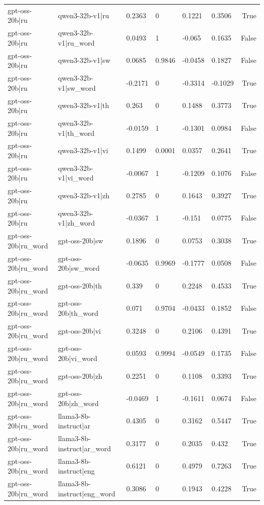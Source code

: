 \begin{table}
\begin{tabular}{llllllr}
gpt-oss-20b|ru & qwen3-32b-v1|ru & 0.2363 & 0 & 0.1221 & 0.3506 & True \\
gpt-oss-20b|ru & qwen3-32b-v1|ru_word & 0.0493 & 1 & -0.065 & 0.1635 & False \\
gpt-oss-20b|ru & qwen3-32b-v1|sw & 0.0685 & 0.9846 & -0.0458 & 0.1827 & False \\
gpt-oss-20b|ru & qwen3-32b-v1|sw_word & -0.2171 & 0 & -0.3314 & -0.1029 & True \\
gpt-oss-20b|ru & qwen3-32b-v1|th & 0.263 & 0 & 0.1488 & 0.3773 & True \\
gpt-oss-20b|ru & qwen3-32b-v1|th_word & -0.0159 & 1 & -0.1301 & 0.0984 & False \\
gpt-oss-20b|ru & qwen3-32b-v1|vi & 0.1499 & 0.0001 & 0.0357 & 0.2641 & True \\
gpt-oss-20b|ru & qwen3-32b-v1|vi_word & -0.0067 & 1 & -0.1209 & 0.1076 & False \\
gpt-oss-20b|ru & qwen3-32b-v1|zh & 0.2785 & 0 & 0.1643 & 0.3927 & True \\
gpt-oss-20b|ru & qwen3-32b-v1|zh_word & -0.0367 & 1 & -0.151 & 0.0775 & False \\
gpt-oss-20b|ru_word & gpt-oss-20b|sw & 0.1896 & 0 & 0.0753 & 0.3038 & True \\
gpt-oss-20b|ru_word & gpt-oss-20b|sw_word & -0.0635 & 0.9969 & -0.1777 & 0.0508 & False \\
gpt-oss-20b|ru_word & gpt-oss-20b|th & 0.339 & 0 & 0.2248 & 0.4533 & True \\
gpt-oss-20b|ru_word & gpt-oss-20b|th_word & 0.071 & 0.9704 & -0.0433 & 0.1852 & False \\
gpt-oss-20b|ru_word & gpt-oss-20b|vi & 0.3248 & 0 & 0.2106 & 0.4391 & True \\
gpt-oss-20b|ru_word & gpt-oss-20b|vi_word & 0.0593 & 0.9994 & -0.0549 & 0.1735 & False \\
gpt-oss-20b|ru_word & gpt-oss-20b|zh & 0.2251 & 0 & 0.1108 & 0.3393 & True \\
gpt-oss-20b|ru_word & gpt-oss-20b|zh_word & -0.0469 & 1 & -0.1611 & 0.0674 & False \\
gpt-oss-20b|ru_word & llama3-8b-instruct|ar & 0.4305 & 0 & 0.3162 & 0.5447 & True \\
gpt-oss-20b|ru_word & llama3-8b-instruct|ar_word & 0.3177 & 0 & 0.2035 & 0.432 & True \\
gpt-oss-20b|ru_word & llama3-8b-instruct|eng & 0.6121 & 0 & 0.4979 & 0.7263 & True \\
gpt-oss-20b|ru_word & llama3-8b-instruct|eng_word & 0.3086 & 0 & 0.1943 & 0.4228 & True \\

\end{tabular}
\end{table}
